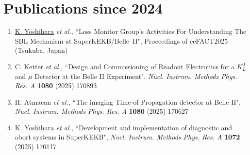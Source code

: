 \documentclass[12pt]{article}
\renewcommand{\labelenumi}{[\arabic{enumi}]}
\begin{document}
{\section*{\Large{Publications since 2024}} 
\vspace{0.1in}
{\footnotesize
\begin{enumerate}
\renewcommand{\labelenumi}{[\arabic{enumi}]} 
%
\item{\underline{K. Yoshihara} \textit{et al.}, ``Loss Monitor Group's Activities For Understanding The SBL Mechanism at SuperKEKB/Belle~II", 
Proceedings of eeFACT2025 (Tsukuba, Japan)}
\item{C. Ketter \textit{et al.}, ``Design and Commissioning of Readout Electronics for a $K_L^0$ and $\mu$ Detector at the Belle II Experiment", 
\textit{Nucl. Instrum. Methods Phys. Res. A} \textbf{1080} (2025) 170893} 
\item{H. Atmacan \textit{et al.}, ``The imaging Time-of-Propagation detector at Belle II", 
\textit{Nucl. Instrum. Methods Phys. Res. A} \textbf{1080} (2025) 170627} 
\item{\underline{K. Yoshihara} \textit{et al.}, ``Development and implementation of diagnostic and abort systems in SuperKEKB", 
\textit{Nucl. Instrum. Methods Phys. Res. A} \textbf{1072} (2025) 170117} 
\end{enumerate}
}

}
\end{document}

